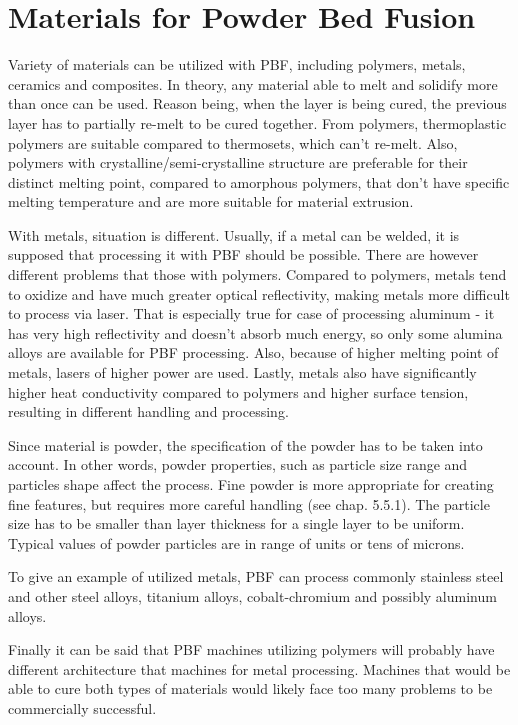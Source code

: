 \documentclass[a4paper, 11pt, reqno]{report}
\begin{document}
\section{Materials for Powder Bed Fusion}
Variety of materials can be utilized with PBF, including polymers, metals, ceramics and composites. In theory, any material able to melt and solidify more than once can be used. Reason being, when the layer is being cured, the previous layer has to partially re-melt to be cured together. From polymers, thermoplastic polymers are suitable compared to thermosets, which can't re-melt. Also, polymers with crystalline/semi-crystalline structure are preferable for their distinct melting point, compared to amorphous polymers, that don't have specific melting temperature and are more suitable for material extrusion.

	With metals, situation is different. Usually, if a metal can be welded, it is supposed that processing it with PBF should be possible. There are however different problems that those with polymers. Compared to polymers, metals tend to oxidize and have much greater optical reflectivity, making metals more difficult to process via laser. That is especially true for case of processing aluminum - it has very high reflectivity and doesn't absorb much energy, so only some alumina alloys are available for PBF processing. Also, because of higher melting point of metals, lasers of higher power are used. Lastly, metals also have significantly higher heat conductivity compared to polymers and higher surface tension, resulting in different handling and processing.
	
	Since material is powder, the specification of the powder has to be taken into account. In other words, powder properties, such as particle size range and particles shape affect the process. Fine powder is more appropriate for creating fine features, but requires more careful handling (see chap. 5.5.1). The particle size has to be smaller than layer thickness for a single layer to be uniform. Typical values of powder particles are in range of units or tens of microns.
	
	To give an example of utilized metals, PBF can process commonly stainless steel and other steel alloys, titanium alloys, cobalt-chromium and possibly aluminum alloys.
	
	Finally it can be said that PBF machines utilizing polymers will probably have different architecture that machines for metal processing. Machines that would be able to cure both types of materials would likely face too many problems to be commercially successful.
\end{document}
